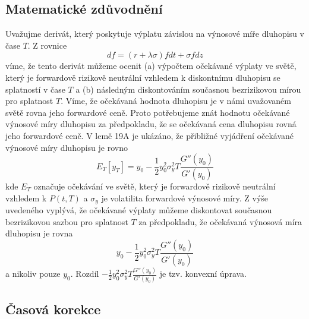 \documentclass[a4paper]{book}
\begin{document}
\subsection{Matematické zdůvodnění}

Uvažujme derivát, který poskytuje výplatu závislou na výnosové míře dluhopisu v čase $T$. Z rovnice
\begin{equation*}
d f = (r + \lambda \sigma)f dt + \sigma f dz
\end{equation*}
víme, že tento derivát můžeme ocenit (a) výpočtem očekávané výplaty ve světě, který je forwardově rizikově neutrální vzhledem k diskontnímu dluhopisu se splatností v čase $T$ a (b) následným diskontováním současnou bezrizikovou mírou pro splatnost $T$. Víme, že očekávaná hodnota dluhopisu je v námi uvažovaném světě rovna jeho forwardové ceně. Proto potřebujeme znát hodnotu očekávané výnosové míry dluhopisu za předpokladu, že se očekávaná cena dluhopisu rovná jeho forwardové ceně. V lemě 19A je ukázáno, že přibližné vyjádření očekávané výnosové míry dluhopisu je rovno
\begin{equation*}
E_T[y_T] = y_0 - \frac{1}{2}y^2_0 \sigma^2_y T \frac{G''(y_0)}{G'(y_0)}
\end{equation*}
kde $E_T$ označuje očekávání ve světě, který je forwardově rizikově neutrální vzhledem k $P(t,T)$ a $\sigma_y$ je volatilita forwardové výnosové míry. Z výše uvedeného vyplývá, že očekávané výplaty můžeme diskontovat současnou bezrizikovou sazbou pro splatnost $T$ za předpokladu, že očekávaná výnosová míra dluhopisu je rovna
\begin{equation*}
y_0 - \frac{1}{2}y^2_0 \sigma^2_y T \frac{G''(y_0)}{G'(y_0)}
\end{equation*}
a nikoliv pouze $y_0$. Rozdíl $-\frac{1}{2}y^2_0 \sigma^2_y T \frac{G''(y_0)}{G'(y_0)}$ je tzv. konvexní úprava.

\subsection{Časová korekce}
\end{document}
